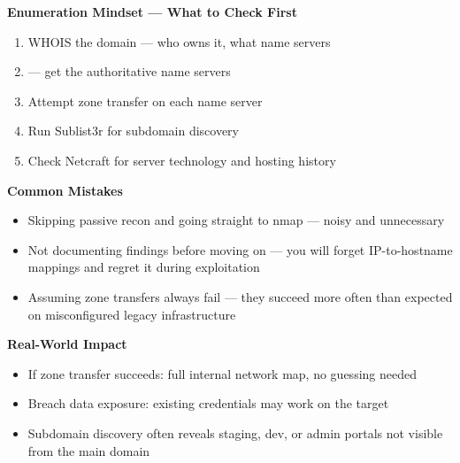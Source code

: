 \begin{takebox}
\begin{whybox}
\begin{notebox}
\begin{takebox}
\textbf{Enumeration Mindset --- What to Check First}
\begin{enumerate}
  \item WHOIS the domain --- who owns it, what name servers
  \item {} --- get the authoritative name servers
  \item Attempt zone transfer on each name server
  \item Run Sublist3r for subdomain discovery
  \item Check Netcraft for server technology and hosting history
\end{enumerate}

\textbf{Common Mistakes}
\begin{itemize}
  \item Skipping passive recon and going straight to nmap --- noisy and unnecessary
  \item Not documenting findings before moving on --- you will forget IP-to-hostname
        mappings and regret it during exploitation
  \item Assuming zone transfers always fail --- they succeed more often than expected
        on misconfigured legacy infrastructure
\end{itemize}

\textbf{Real-World Impact}
\begin{itemize}
  \item If zone transfer succeeds: full internal network map, no guessing needed
  \item Breach data exposure: existing credentials may work on the target
  \item Subdomain discovery often reveals staging, dev, or admin portals not visible
        from the main domain
\end{itemize}
\end{takebox}

\end{notebox}
\end{whybox}
\end{takebox}